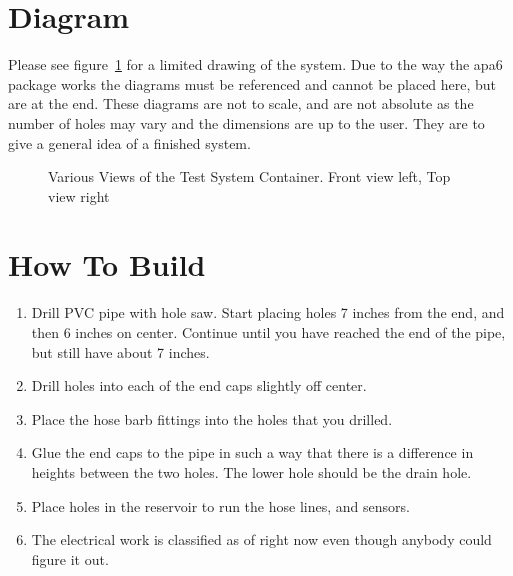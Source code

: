 \documentclass[american,12pt]{article}
\begin{document}
\section{Diagram}
Please see figure~\ref{fig:views} for a limited drawing of the system.
Due to the way the apa6 package works the
diagrams must be referenced and cannot be placed here, but are at the end. These
diagrams are not to scale, and are not absolute as the number of holes may vary
and the dimensions are up to the user. They are to give a general idea of a
finished system.

\begin{figure}[h]
    \centering
    \caption{Various Views of the Test System Container. Front view left, Top
    view right}
    \label{fig:views}
\end{figure}

\section{How To Build}
\begin{enumerate}
    \item Drill PVC pipe with hole saw. Start placing holes 7 inches from the
        end, and then 6 inches on center. Continue until you have reached
        the end of the pipe, but still have about 7 inches.
    \item Drill holes into each of the end caps slightly off center.
    \item Place the hose barb fittings into the holes that you drilled.
    \item Glue the end caps to the pipe in such a way that there is a difference
   	      in heights between the two holes. The lower hole should be the drain
   	      hole.
   	\item Place holes in the reservoir to run the hose lines, and sensors.
   	\item The electrical work is classified as of right now even though anybody
   	      could figure it out.
\end{enumerate}
\end{document}
